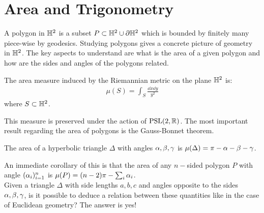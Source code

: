 \section{Area and Trigonometry}
A polygon in $\mathbb{H}^2$ is a subset $P\subset \mathbb{H}^2\cup{\partial \mathbb{H}^2}$ which is bounded by finitely many piece-wise by geodesics. Studying polygons gives a concrete picture of geometry in $\mathbb{H}^2$. The key aspects to understand are what is the area of a given polygon and how are the sides and angles of the polygons related. 
\begin{definition}
  The area measure induced by the Riemannian metric on the plane $\mathbb{H}^2$ is:
  \begin{align}
    \mu(S) = \int_S \frac{\dd x\dd y}{y^2}
  \end{align}
  where $S\subset \mathbb{H}^2$.
\end{definition}
This measure is preserved under the action of $\text{PSL}(2,\mathbb{R})$. The most important result regarding the area of polygons is the Gauss-Bonnet theorem.
\begin{theorem}
  The area of a hyperbolic triangle $\Delta$ with angles $\alpha,\beta,\gamma$ is $\mu(\Delta) = \pi-\alpha-\beta-\gamma$.
\end{theorem}
An immediate corollary of this is that the area of any $n-$sided polygon $P$ with angle $(\alpha_i)_{i=1}^n$ is $\mu(P) = (n-2)\pi - \sum_i \alpha_i$.\\

Given a triangle $\Delta$ with side lengths $a,b,c$ and angles opposite to the sides $\alpha,\beta,\gamma$, is it possible to deduce a relation between these quantities like in the case of Euclidean geometry? The answer is yes!

